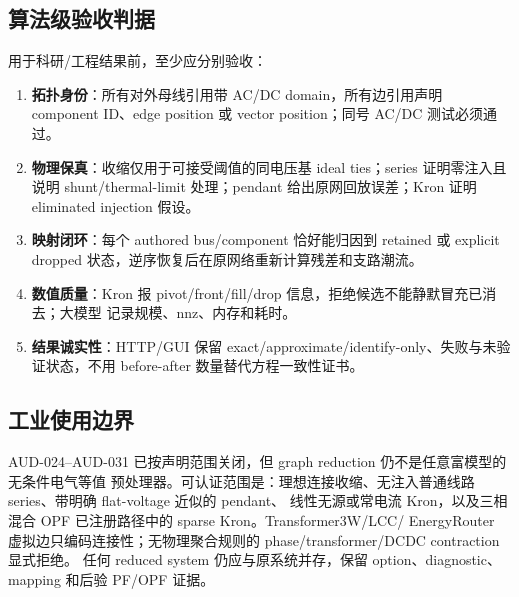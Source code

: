 \subsection{算法级验收判据}

用于科研/工程结果前，至少应分别验收：
\begin{enumerate}
  \item \textbf{拓扑身份}：所有对外母线引用带 AC/DC domain，所有边引用声明 component ID、edge
        position 或 vector position；同号 AC/DC 测试必须通过。
  \item \textbf{物理保真}：收缩仅用于可接受阈值的同电压基 ideal ties；series 证明零注入且说明
        shunt/thermal-limit 处理；pendant 给出原网回放误差；Kron 证明 eliminated injection 假设。
  \item \textbf{映射闭环}：每个 authored bus/component 恰好能归因到 retained 或 explicit dropped
        状态，逆序恢复后在原网络重新计算残差和支路潮流。
  \item \textbf{数值质量}：Kron 报 pivot/front/fill/drop 信息，拒绝候选不能静默冒充已消去；大模型
        记录规模、nnz、内存和耗时。
  \item \textbf{结果诚实性}：HTTP/GUI 保留 exact/approximate/identify-only、失败与未验证状态，不用
        before-after 数量替代方程一致性证书。
\end{enumerate}

\subsection{工业使用边界}

AUD-024--AUD-031 已按声明范围关闭，但 graph reduction 仍不是任意富模型的无条件电气等值
预处理器。可认证范围是：理想连接收缩、无注入普通线路 series、带明确 flat-voltage 近似的 pendant、
线性无源或常电流 Kron，以及三相混合 OPF 已注册路径中的 sparse Kron。Transformer3W/LCC/
EnergyRouter 虚拟边只编码连接性；无物理聚合规则的 phase/transformer/DCDC contraction 显式拒绝。
任何 reduced system 仍应与原系统并存，保留 option、diagnostic、mapping 和后验 PF/OPF 证据。
